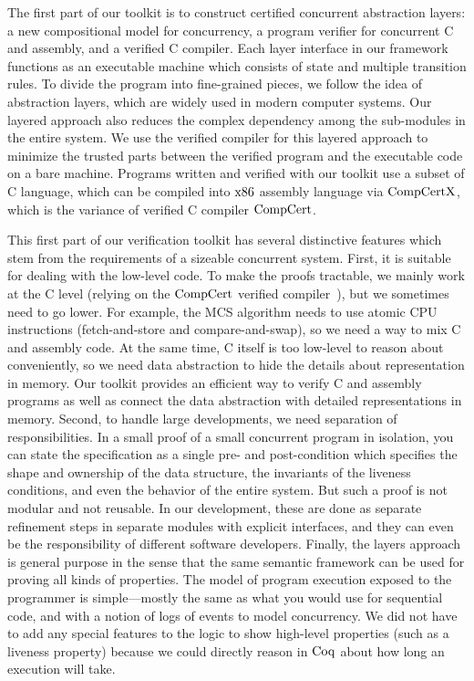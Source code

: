 The first part of our toolkit is to construct certified concurrent abstraction layers: a new compositional model for concurrency, 
a program verifier for concurrent C and assembly, and a verified C compiler. 
Each layer interface in our framework functions as an executable machine which consists of state and multiple transition rules. 
To divide the program into fine-grained pieces, we follow the idea of abstraction layers, which are widely used in modern computer systems. 
Our layered approach also reduces the complex dependency among the sub-modules in the entire system.
We use the verified compiler for this layered approach to minimize the trusted parts between the verified program and the executable code 
on a bare machine. Programs written and verified with our toolkit use a subset of C language, 
which can be compiled into $\mathrm{x86}$ assembly language via $\mathrm{CompCertX}$, which is the variance of verified C compiler $\mathrm{CompCert}$.

This first part of our verification toolkit has several distinctive features which stem from the requirements of 
a sizeable concurrent system. First, it is suitable for dealing with the low-level code. To make the proofs tractable, 
we mainly work at the C level (relying on the $\mathrm{CompCert}$ verified compiler~\cite{compcert}), 
but we sometimes need to go lower. 
For example, the MCS algorithm needs to use atomic CPU instructions (fetch-and-store and compare-and-swap), 
so we need a way to mix C and assembly code. At the same time, C itself is too low-level to reason about conveniently, 
so we need data abstraction to hide the details about representation in memory. 
Our toolkit provides an efficient way to verify C and assembly programs as well as connect the data abstraction 
with detailed representations in memory. Second, to handle large developments, we need separation of responsibilities. 
In a small proof of a small concurrent program in isolation, 
you can state the specification as a single pre- and post-condition which specifies the shape and ownership of the data structure, 
the invariants of the liveness conditions, and even the behavior of the entire system. 
But such a proof is not modular and not reusable. In our development, 
these are done as separate refinement steps in separate modules with explicit interfaces, 
and they can even be the responsibility of different software developers. 
Finally, the layers approach is general purpose in the sense that the same semantic framework can be used for proving all kinds of properties. 
The model of program execution exposed to the programmer is simple—mostly the same as what you would use for sequential code, 
and with a notion of logs of events to model concurrency. We did not have to add any special features to the logic to show high-level 
properties (such as a liveness property) because we could directly reason in $\mathrm{Coq}$ about how long an execution will take.

